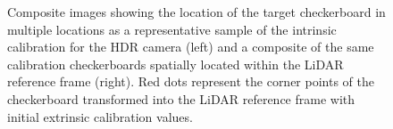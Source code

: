 \documentclass{erauthesis}
\begin{document}
\begin{figure}[htbp]
\centering
{}
\caption{Composite images showing the location of the target checkerboard in multiple locations as a representative sample of the intrinsic calibration for the HDR camera (left) and a composite of the same calibration checkerboards spatially located within the LiDAR reference frame (right). Red dots represent the corner points of the checkerboard transformed into the LiDAR reference frame with initial extrinsic calibration values.}
\label{fig:camLidar_calib}
\end{figure}
\end{document}
